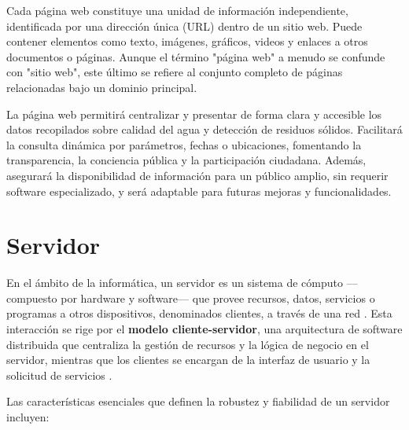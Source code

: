 Cada página web constituye una unidad de información independiente, identificada por una dirección única (URL) dentro de un sitio web. Puede contener elementos como texto, imágenes, gráficos, videos y enlaces a otros documentos o páginas. Aunque el término "página web" a menudo se confunde con "sitio web", este último se refiere al conjunto completo de páginas relacionadas bajo un dominio principal.

La página web permitirá centralizar y presentar de forma clara y accesible los datos recopilados sobre calidad del agua y detección de residuos sólidos. Facilitará la consulta dinámica por parámetros, fechas o ubicaciones, fomentando la transparencia, la conciencia pública y la participación ciudadana. Además, asegurará la disponibilidad de información para un público amplio, sin requerir software especializado, y será adaptable para futuras mejoras y funcionalidades.



\section{Servidor}

En el ámbito de la informática, un servidor es un sistema de cómputo —compuesto por hardware y software— que provee recursos, datos, servicios o programas a otros dispositivos, denominados clientes, a través de una red \cite{Espana2003}. Esta interacción se rige por el \textbf{modelo cliente-servidor}, una arquitectura de software distribuida que centraliza la gestión de recursos y la lógica de negocio en el servidor, mientras que los clientes se encargan de la interfaz de usuario y la solicitud de servicios \cite{Britannica2024}.

Las características esenciales que definen la robustez y fiabilidad de un servidor incluyen:

